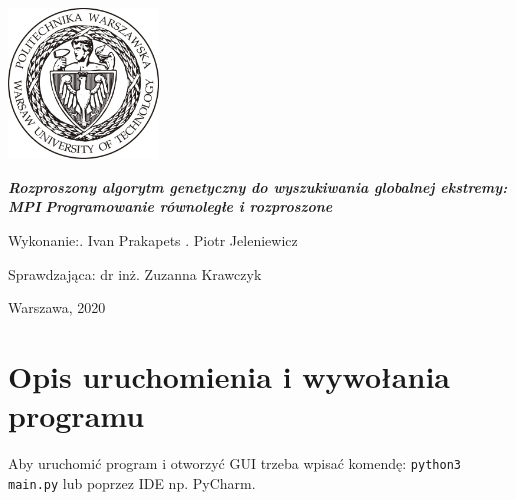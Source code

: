 \documentclass[a4paper, 12pt]{article}
\newcommand{\mainmatter}{\clearpage \cfoot{\thepage\ of \pageref{LastPage}}
\pagenumbering{arabic}}
\begin{document}
	\begin{titlepage}
\includegraphics[width = 40mm]{logo.jpg}
		\begin{center}
    			\vspace{3cm}
    					\Large\textit{\textbf{Rozproszony algorytm genetyczny  do wyszukiwania globalnej ekstremy: MPI}}
    					\Large\textit{\textbf{Programowanie równoległe i rozproszone}}
   			\vspace{4cm}
		\end{center} 

		\hfill\begin{minipage}{0.54\textwidth}
			\Large Wykonanie:. Ivan Prakapets  . Piotr Jeleniewicz 
		\vspace{\baselineskip}
		\end{minipage}
		
		\hfill\begin{minipage}{0.54\textwidth}
			\Large Sprawdzająca:\newline
		 		dr inż. Zuzanna Krawczyk
\vspace{\baselineskip}
		\end{minipage}
	
		\hfill\begin{minipage}{0.7\textwidth}
		\vspace{1cm}
			\Large Warszawa, 2020
			\vspace{\baselineskip}
		\end{minipage}
	\end{titlepage}
\newpage
\mainmatter
\setlength{\headheight}{15pt}
\doublespacing
\tableofcontents
\newpage

\linespread{0.5}

\section{Opis uruchomienia i wywołania programu}
Aby uruchomić program i otworzyć GUI trzeba wpisać komendę: \texttt{python3 main.py} lub poprzez IDE np. PyCharm.
\end{document}
